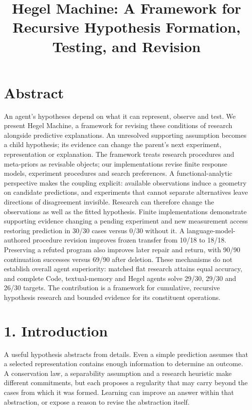 \documentclass[11pt,a4paper]{article}
\author{}
\date{}
\begin{document}
\title{Hegel Machine: A Framework for Recursive Hypothesis Formation, Testing, and Revision}
\maketitle

\section*{Abstract}

An agent's hypotheses depend on what it can represent, observe and test. We present Hegel Machine, a framework for revising these conditions of research alongside predictive explanations. An unresolved supporting assumption becomes a child hypothesis; its evidence can change the parent's next experiment, representation or explanation. The framework treats research procedures and meta-priors as revisable objects; our implementations revise finite response models, experiment procedures and search preferences. A functional-analytic perspective makes the coupling explicit: available observations induce a geometry on candidate predictions, and experiments that cannot separate alternatives leave directions of disagreement invisible. Research can therefore change the observations as well as the fitted hypothesis. Finite implementations demonstrate supporting evidence changing a pending experiment and new measurement access restoring prediction in 30/30 cases versus 0/30 without it. A language-model-authored procedure revision improves frozen transfer from 10/18 to 18/18. Preserving a refuted program also improves later repair and return, with 90/90 continuation successes versus 69/90 after deletion. These mechanisms do not establish overall agent superiority: matched flat research attains equal accuracy, and complete Code, textual-memory and Hegel agents solve 29/30, 29/30 and 26/30 targets. The contribution is a framework for cumulative, recursive hypothesis research and bounded evidence for its constituent operations.


\section*{1. Introduction}

A useful hypothesis abstracts from details. Even a simple prediction assumes that a selected representation contains enough information to determine an outcome. A conservation law, a separability assumption and a research heuristic make different commitments, but each proposes a regularity that may carry beyond the cases from which it was formed. Learning can improve an answer within that abstraction, or expose a reason to revise the abstraction itself.
\end{document}
